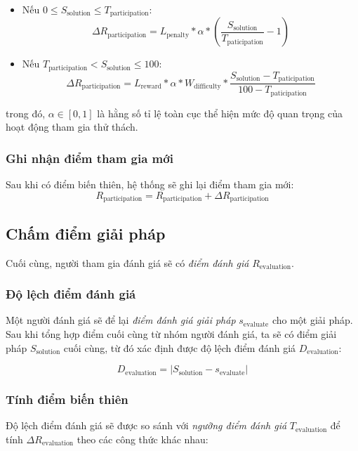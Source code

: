 \begin{itemize}
  \item Nếu $0 \leq S_{\text{solution}} \leq  T_{\text{participation}}$:
        \[\Delta R_{\text{participation}} = L_{\text{penalty}} * \alpha * \left( \frac{S_{\text{solution}}}{T_{\text{paticipation}}}-1 \right)\]
  \item Nếu $T_{\text{participation}} < S_{\text{solution}} \leq 100$:
        \[\Delta R_{{\text{participation}}} = L_{\text{reward}} * \alpha*W_{\text{difficulty}} * \frac{S_{\text{solution}} - T_{\text{paticipation}}}{100-T_{\text{paticipation}}} \]
\end{itemize}
trong đó, $\alpha \in [0, 1]$ là hằng số tỉ lệ toàn cục thể hiện mức độ quan trọng của hoạt động tham gia thử thách.

\subsubsection{Ghi nhận điểm tham gia mới}

Sau khi có điểm biến thiên, hệ thống sẽ ghi lại điểm tham gia mới:
\[R_{\text{participation}} = R_{\text{participation}} + \Delta R_{\text{participation}}\]

\subsection{Chấm điểm giải pháp}

Cuối cùng, người tham gia đánh giá sẽ có \textit{điểm đánh giá} $R_{\text{evaluation}}$.

\subsubsection{Độ lệch điểm đánh giá}

Một người đánh giá sẽ để lại \textit{điểm đánh giá giải pháp} $s_{\text{evaluate}}$ cho một giải pháp. Sau khi tổng hợp điểm cuối cùng từ nhóm người đánh giá,
ta sẽ có điểm giải pháp $S_{\text{solution}}$ cuối cùng, từ đó xác định được độ lệch điểm đánh giá $D_{\text{evaluation}}$:

\[D_{\text{evaluation}}=|S_{\text{solution}}-s_{\text{evaluate}}|\]

\subsubsection{Tính điểm biến thiên}

Độ lệch điểm đánh giá sẽ được so sánh với \textit{ngưỡng điểm đánh giá} $T_{\text{evaluation}}$ để tính $\Delta R_{\text{evaluation}}$ theo các công thức khác nhau:

